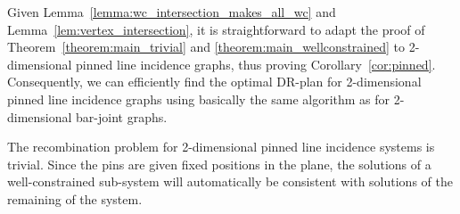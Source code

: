 Given Lemma~\ref{lemma:wc_intersection_makes_all_wc} and Lemma~\ref{lem:vertex_intersection},
it is straightforward to adapt the proof of Theorem~\ref{theorem:main_trivial} and \ref{theorem:main_wellconstrained}
to  2-dimensional pinned line incidence graphs,
thus proving Corollary~\ref{cor:pinned}.
Consequently, we can efficiently find the optimal DR-plan for 2-dimensional pinned line incidence graphs using basically the same algorithm as for 2-dimensional bar-joint graphs.

\begin{remark}
The recombination problem for 2-dimensional pinned line incidence systems is trivial.
Since the pins are given fixed positions in the plane,
 the solutions of a well-constrained sub-system will automatically be consistent with solutions of the remaining of the system.
 \end{remark}

